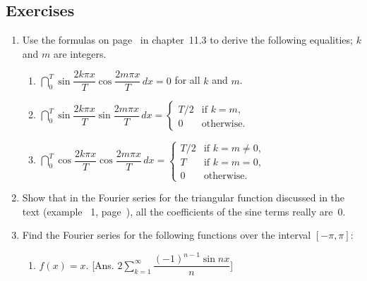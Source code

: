 \subsection{Exercises}
\label{subsec:exercises}




\begin{enumerate}
\item Use the formulas on page~\pageref{`trig'} in chapter~11.3 to
derive the following equalities; $k$ and $m$ are integers.





  \begin{enumerate}
  \item $\dint_0^T \sin\dfrac{2k\pi x}{T} \cos\dfrac{2m\pi x}{T} \, dx
  =  0$ for all $k$ and $m$.





  \item $\dint_0^T \sin\dfrac{2k\pi x}{T} \sin\dfrac{2m\pi x}{T} \, dx
  = \begin{cases}
	T/2 & \text{if $k=m$}, \\
	0   & \text{otherwise}.
     \end{cases}$





  \item $\dint_0^T \cos\dfrac{2k\pi x}{T} \cos\dfrac{2m\pi x}{T} \, dx
  = \begin{cases}
	T/2  & \text{if $k=m \ne 0$}, \\
	T & \text{if $k=m=0$}, \\
	0    & \text{otherwise}.
     \end{cases}$


\end{enumerate}
\item Show that in the Fourier series for the triangular function
discussed in the text (example ~1, page~\pageref{triangle function}),
all the coefficients of the sine terms really are~0.



\item Find the Fourier series for the following functions over the
interval $[-\pi,\pi]$:


  \begin{enumerate}
  \item $f(x)=x$. \hfill [Ans. ${\displaystyle
    2\sum_{k=1}^{\infty}\dfrac{(-1)^{n-1}\sin nx}{n}}$]



\end{enumerate}
\end{enumerate}
